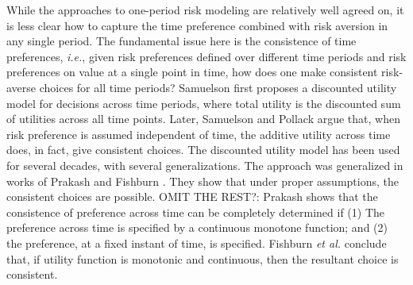 \documentclass[mnsc,nonblindrev,copyedit]{informs2_wz} %
\begin{document}
While the approaches to one-period risk modeling are relatively well agreed on, it is less clear how to capture the time preference combined with risk aversion in any single period.  The fundamental issue here is the consistence of time preferences, {\it i.e.}, given risk preferences defined over different time periods and risk preferences on value at a single point in time, how does one make consistent risk-averse choices for all time periods? Samuelson \cite{Samuelson1937} first proposes a discounted utility model for decisions across time periods, where total utility is the discounted sum of utilities across all time points.  Later, Samuelson \cite{Samuelson1952} and Pollack \cite{Pollak} argue that, when risk preference is assumed independent of time, the additive utility across time does, in fact,  give consistent choices.  The discounted utility model has been used for several decades, with several generalizations.  The approach was generalized in works of Prakash \cite{Prakash1976} and Fishburn \cite{Fishburn1989}.  They show that under proper assumptions, the consistent choices are possible.  OMIT THE REST?: Prakash \cite{Prakash1976} shows that the consistence of preference across time can be completely determined if (1) The preference across time is specified by a continuous monotone function; and (2) the preference, at a fixed instant of time, is specified.  Fishburn {\it et al.} \cite{Fishburn1982} conclude that, if utility function is monotonic and continuous, then the resultant choice is consistent.  
\end{document}
